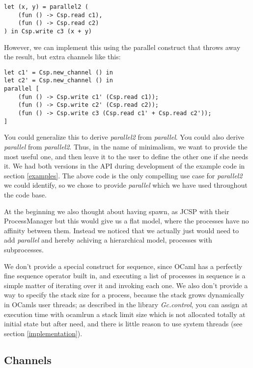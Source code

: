 \documentclass[a4paper,12pt]{article}
\begin{document}
\begin{verbatim}
let (x, y) = parallel2 (
    (fun () -> Csp.read c1), 
    (fun () -> Csp.read c2)
) in Csp.write c3 (x + y)
\end{verbatim}

However, we can implement this using the parallel construct that throws away
the result, but extra channels like this:

\begin{verbatim}
let c1' = Csp.new_channel () in
let c2' = Csp.new_channel () in
parallel [
    (fun () -> Csp.write c1' (Csp.read c1));
    (fun () -> Csp.write c2' (Csp.read c2));
    (fun () -> Csp.write c3 (Csp.read c1' + Csp.read c2'));
]
\end{verbatim}

You could generalize this to derive \emph{parallel2} from \emph{parallel}. You
could also derive \emph{parallel} from \emph{parallel2}. Thus, in the name of
minimalism, we want to provide the most useful one, and then leave it to the
user to define the other one if she needs it. We had both versions in the API
during development of the example code in section \ref{examples}. The above code
is the only compelling use case for \emph{parallel2} we could identify, so we
chose to provide \emph{parallel} which we have used throughout the code base.

At the beginning we also thought about having spawn, as JCSP with their
ProcessManager but this would give us a flat model, where the processes have no
affinity between them. Instead we noticed that we actually just would need to
add {\it parallel} and hereby achiving a hierarchical model, processes with
subprocesses.

We don't provide a special construct for sequence, since OCaml has a perfectly
fine sequence operator built in, and executing a list of processes in sequence
is a simple matter of iterating over it and invoking each one. We also don't
provide a way to specify the stack size for a process, because the stack grows
dynamically in OCamls user threads; as described in the library {\it Gc.control},
you can assign at execution time with ocamlrun a stack limit size which is not
allocated totally at initial state but after need, and there is little reason to
use system threads (see section \ref{implementation}).

\subsection{Channels}
\end{document}
